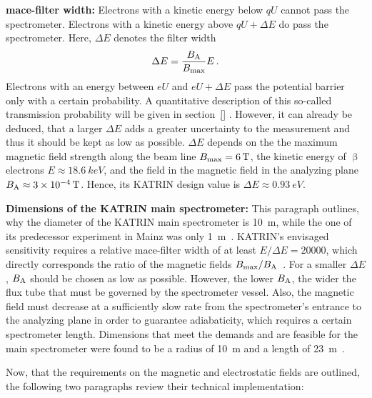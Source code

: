 {\par \textbf{\gls{mace}-filter width:} 
Electrons with a kinetic energy below $qU$ cannot pass the spectrometer. Electrons with a kinetic energy above $qU+\Delta E$ do pass the spectrometer. Here, $\Delta E$ denotes the filter width \cite{Angrik:2005ep}
\begin{equation}
\Delta E = \frac{B_\mathrm{A}}{B_\mathrm{max}} E
\text{\,.}
\end{equation}
Electrons with an energy between $eU$ and $eU+\Delta E$ pass the potential barrier only with a certain probability. A quantitative description of this so-called transmission probability will be given in section~\ref{} . However, it can already be deduced, that a larger $\Delta E$ adds a greater uncertainty to the measurement and thus it should be kept as low as possible. $\Delta E$ depends on the the maximum magnetic field strength along the beam line $B_\mathrm{max}=\SI{6}{T}$, the kinetic energy of $\upbeta$ electrons $E\approx\SI{18.6}{keV}$, and the field in the magnetic field in the analyzing plane $B_\mathrm{A}\approx\SI{3e-4}{T}$. Hence, its KATRIN design value is $\Delta E\approx\SI{0.93}{eV}$. }

{\par \textbf{Dimensions of the KATRIN main spectrometer:} This paragraph outlines, why the diameter of the KATRIN main spectrometer is \SI{10}{m}, while the one of its predecessor experiment in Mainz was only \SI{1}{m}~\cite{Kraus2005}. KATRIN's envisaged sensitivity requires a relative \gls{mace}-filter width of at least $E/\Delta E = 20000$, which directly corresponds the ratio of the magnetic fields $B_\mathrm{max}/B_\mathrm{A}$~\cite{Angrik:2005ep}. For a smaller $\Delta E$, $B_\mathrm{A}$ should be chosen as low as possible. However, the lower $B_\mathrm{A}$, the wider the flux tube that must be governed by the spectrometer vessel. Also, the magnetic field must decrease at a sufficiently slow rate from the spectrometer's entrance to the analyzing plane in order to guarantee adiabaticity, which requires a certain spectrometer length. Dimensions that meet the demands and are feasible for the main spectrometer were found to be a radius of \SI{10}{m} and a length of \SI{23}{m}~\cite{Angrik:2005ep, Valerius2009}.}

Now, that the requirements on the magnetic and electrostatic fields are outlined, the following two paragraphs review their technical implementation:

